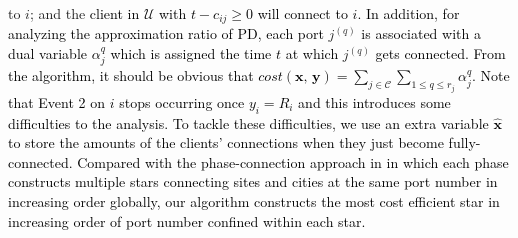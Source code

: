 \documentclass[10pt]{llncs}
\begin{document}
to $ $$i$; and the \textcolor{black}{client in $\mathcal{U}$ with
$t-c_{ij}\geq0$ will connect to $i$. In addition, for analyzing
the approximation ratio of PD, each port }$j^{\left(q\right)}$\textcolor{black}{{}
is associated with a dual variable $\alpha_{j}^{q}$ which is assigned
the time $t$ at which }$j^{\left(q\right)}$\textcolor{black}{{} gets
connected. From the algorithm, it should be obvious that $cost\left(\boldsymbol{x},\,\boldsymbol{y}\right)=\sum_{j\in\mathcal{C}}\sum_{1\leq q\leq r_{j}}\alpha_{j}^{q}$.
Note that Event 2 on $i$ stops occurring once $y_{i}=R_{i}$ and
this introduces some difficulties to the analysis. To tackle these
difficulties, we use an extra variable $\boldsymbol{\hat{x}}$ to
store the amounts of the clients' connections when they just become
fully-connected. Compared with the phase-connection approach in \cite{shihongftfa}
in which each phase constructs multiple stars connecting sites and
cities at the same port number in increasing order globally, our algorithm
constructs the most cost efficient star in increasing order of port
number confined within each star.}
\end{document}
